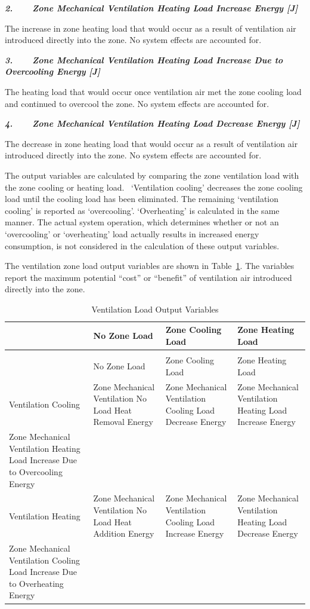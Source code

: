 \textbf{\emph{2.~~~~Zone Mechanical Ventilation Heating Load Increase Energy {[}J{]}}}

The increase in zone heating load that would occur as a result of ventilation air introduced directly into the zone. No system effects are accounted for.

\textbf{\emph{3.~~~~Zone Mechanical Ventilation Heating Load Increase Due to Overcooling Energy {[}J{]}}}

The heating load that would occur once ventilation air met the zone cooling load and continued to overcool the zone. No system effects are accounted for.

\textbf{\emph{4.~~~~Zone Mechanical Ventilation Heating Load Decrease Energy {[}J{]}}}

The decrease in zone heating load that would occur as a result of ventilation air introduced directly into the zone. No system effects are accounted for.

The output variables are calculated by comparing the zone ventilation load with the zone cooling or heating load.~ `Ventilation cooling' decreases the zone cooling load until the cooling load has been eliminated. The remaining `ventilation cooling' is reported as `overcooling'. `Overheating' is calculated in the same manner. The actual system operation, which determines whether or not an `overcooling' or `overheating' load actually results in increased energy consumption, is not considered in the calculation of these output variables.

The ventilation zone load output variables are shown in Table~\ref{table:ventilation-load-output-variables}. The variables report the maximum potential ``cost'' or ``benefit'' of ventilation air introduced directly into the zone.

\begin{longtable}[c]{p{1.5in}p{1.5in}p{1.5in}p{1.5in}}
\caption{Ventilation Load Output Variables \label{table:ventilation-load-output-variables}} \tabularnewline
\toprule 
 & No Zone Load & Zone Cooling Load & Zone Heating Load \tabularnewline
\midrule
\endfirsthead

\caption[]{Ventilation Load Output Variables} \tabularnewline
\toprule 
 & No Zone Load & Zone Cooling Load & Zone Heating Load \tabularnewline
\midrule
\endhead

Ventilation Cooling & Zone Mechanical Ventilation No Load Heat Removal Energy & Zone Mechanical Ventilation Cooling Load Decrease Energy & Zone Mechanical Ventilation Heating Load Increase Energy \tabularnewline
Zone Mechanical Ventilation Heating Load Increase Due to Overcooling Energy \tabularnewline
Ventilation Heating & Zone Mechanical Ventilation No Load Heat Addition Energy & Zone Mechanical Ventilation Cooling Load Increase Energy & Zone Mechanical Ventilation Heating Load Decrease Energy \tabularnewline
Zone Mechanical Ventilation Cooling Load Increase Due to Overheating Energy \tabularnewline
\bottomrule
\end{longtable}


